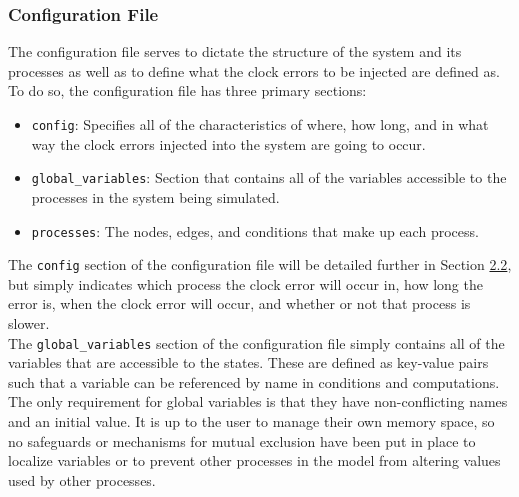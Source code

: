 \documentclass[12pt]{extarticle}
\begin{document}
\subsubsection{Configuration File}\label{sec:config}
The configuration file serves to dictate the structure of the system and its processes as well as to define what the clock errors to be injected are defined as. To do so, the configuration file has three primary sections:
\begin{itemize}
    \item \texttt{config}: Specifies all of the characteristics of where, how long, and in what way the clock errors injected into the system are going to occur.
    \item \texttt{global\_variables}: Section that contains all of the variables accessible to the processes in the system being simulated.
    \item \texttt{processes}: The nodes, edges, and conditions that make up each process.
\end{itemize}

The \texttt{config} section of the configuration file will be detailed further in Section \hyperref[sec:clkerr]{2.2}, but simply indicates which process the clock error will occur in,  how long the error is, when the clock error will occur, and whether or not that process is slower.\\

The \texttt{global\_variables} section of the configuration file simply contains all of the variables that are accessible to the states. These are defined as key-value pairs such that a variable can be referenced by name in conditions and computations. The only requirement for global variables is that they have non-conflicting names and an initial value. It is up to the user to manage their own memory space, so no safeguards or mechanisms for mutual exclusion have been put in place to localize variables or to prevent other processes in the model from altering values used by other processes.\\
\end{document}
